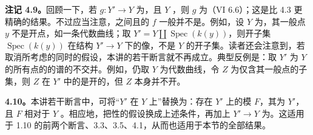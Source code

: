 \textbf{注记 4.9。}回顾一下，若 $g:Y'\to Y$ 为，且 $Y$ ，则 $g$ 为（VI 6.6）；这是比 4.3 更精确的结果。不过应当注意，之间且的 $f$ 一般并不是。例如，设 $Y$ 为，其一般点 $y$ 不是开点，如一条代数曲线；取 $Y'=Y\amalg\operatorname{Spec}(k(y))$，则开子集 $\operatorname{Spec}(k(y))$ 在结构 $Y'\to Y$ 下的像，不是 $Y$ 的开子集。读者还会注意到，若取消所考虑的同时的假设，本讲的若干断言就不再成立。典型反例是：取 $Y'$ 为 $Y$ 的所有点的的谱的不交并。例如，仍取 $Y$ 为代数曲线，令 $Z$ 为仅含其一般点的子集，则 $Z$ 在 $Y'$ 中的是开的，但 $Z$ 本身并不开。

\textbf{4.10。}本讲若干断言中，可将“$Y'$ 在 $Y$ 上”替换为：存在 $Y'$ 上的模 $F$，其为 $Y'$，且 $F$ 相对于 $Y$ 。相应地，把性的假设换成上述条件，再加上 $Y'\to Y$ 为。这适用于 1.10 的前两个断言、3.3、3.5、4.1，从而也适用于本节的全部结果。


